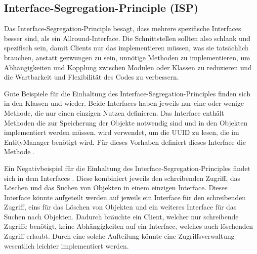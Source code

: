 \subsection{Interface-Segregation-Principle (ISP)}
Das Interface-Segregation-Principle besagt, dass mehrere spezifische Interfaces besser sind, als ein Allround-Interface. Die Schnittstellen sollten also schlank und spezifisch sein, damit Clients nur das implementieren müssen, was sie tatsächlich brauchen, anstatt gezwungen zu sein, unnötige Methoden zu implementieren, um Abhängigkeiten und Kopplung zwischen Modulen oder Klassen zu reduzieren und die Wartbarkeit und Flexibilität des Codes zu verbessern.

Gute Beispiele für die Einhaltung des Interface-Segregation-Principles finden sich in den Klassen \href{https://github.com/MichaelaHaag/RezeptApp/blob/main/1-Adapter/src/main/java/de/rezeptapp/adapter/Datenpersistenz/ICSVPersistierbar.java}{} und \href{https://github.com/MichaelaHaag/RezeptApp/tree/main/3-Domain-Code/src/main/java/de/rezeptapp/domain/IPersistierbar.java}{} wieder.
Beide Interfaces haben jeweils nur eine oder wenige Methode, die nur einen einzigen Nutzen definieren. Das Interface  enthält Methoden die zur Speicherung der Objekte notwendig sind und in den Objekten implementiert werden müssen.  wird verwendet, um die UUID zu lesen, die im EntityManager benötigt wird. Für dieses Vorhaben definiert dieses Interface die Methode .

Ein Negativbeispiel für die Einhaltung des Interface-Segregation-Principles findet sich in dem Interfaces . Diese kombiniert jeweils den schreibenden Zugriff, das Löschen und das Suchen von Objekten in einem einzigen Interface. Dieses Interface könnte aufgeteilt werden auf jeweils ein Interface für den schreibenden Zugriff, eins für das Löschen von Objekten und ein weiteres Interface für das Suchen nach Objekten. Dadurch bräuchte ein Client, welcher nur schreibende Zugriffe benötigt, keine Abhängigkeiten auf ein Interface, welches auch löschenden Zugriff erlaubt. Durch eine solche Aufteilung könnte eine Zugriffsverwaltung wesentlich leichter implementiert werden.

